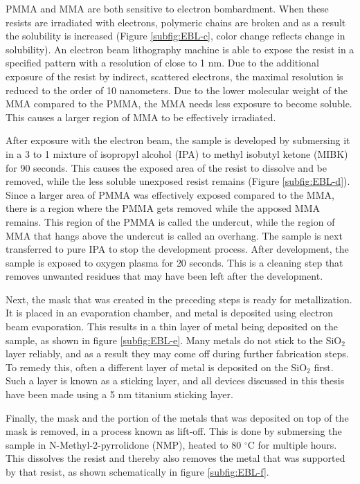 PMMA and MMA are both sensitive to electron bombardment. When these resists are irradiated with electrons, polymeric chains are broken and as a result the solubility is increased (Figure \ref{subfig:EBL-c}, color change reflects change in solubility). An electron beam lithography machine is able to expose the resist in a specified pattern with a resolution of close to 1 nm. Due to the additional exposure of the resist by indirect, scattered electrons, the maximal resolution is reduced to the order of 10 nanometers. Due to the lower molecular weight of the MMA compared to the PMMA, the MMA needs less exposure to become soluble. This causes a larger region of MMA to be effectively irradiated.

After exposure with the electron beam, the sample is developed by submersing it in a 3 to 1 mixture of isopropyl alcohol (IPA) to methyl isobutyl ketone (MIBK) for 90 seconds. This causes the exposed area of the resist to dissolve and be removed, while the less soluble unexposed resist remains (Figure \ref{subfig:EBL-d}). Since a larger area of PMMA was effectively exposed compared to the MMA, there is a region where the PMMA gets removed while the apposed MMA remains. This region of the PMMA is called the undercut, while the region of MMA that hangs above the undercut is called an overhang. The sample is next transferred to pure IPA to stop the development process. After development, the sample is exposed to oxygen plasma for 20 seconds. This is a cleaning step that removes unwanted residues that may have been left after the development.

Next, the mask that was created in the preceding steps is ready for metallization. It is placed in an evaporation chamber, and metal is deposited using electron beam evaporation. This results in a thin layer of metal being deposited on the sample, as shown in figure \ref{subfig:EBL-e}. Many metals do not stick to the SiO$_2$ layer reliably, and as a result they may come off during further fabrication steps. To remedy this, often a different layer of metal is deposited on the SiO$_2$ first. Such a layer is known as a sticking layer, and all devices discussed in this thesis have been made using a 5 nm titanium sticking layer.

Finally, the mask and the portion of the metals that was deposited on top of the mask is removed, in a process known as lift-off. This is done by submersing the sample in N-Methyl-2-pyrrolidone (NMP), heated to 80 $^{\circ}$C for multiple hours. This dissolves the resist and thereby also removes the metal that was supported by that resist, as shown schematically in figure \ref{subfig:EBL-f}.

